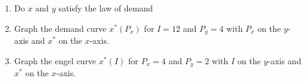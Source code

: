 \documentclass[11pt]{article}
\newcommand{\answer}[1]{\iftoggle{INCLUDEANSWERS}{{\color{violet!70!white}\textbf{Solution:} #1}}{}}
\begin{document}
\begin{enumerate}
\begin{enumerate}
    \item Do $x$ and $y$ satisfy the law of demand
    
    \item Graph the demand curve $x^*(P_x)$ for $I = 12$ and $P_y = 4$ with $P_x$ on the $y$-axis and $x^*$ on the $x$-axis.
    
    \item Graph the engel curve $x^*(I)$ for $P_x = 4$ and $P_y = 2$ with $I$ on the $y$-axis and $x^*$ on the $x$-axis.
  \end{enumerate}

  \answer{
    From above, $x^* = \frac{I}{2P_x}$ and $y^* = \frac{I}{2P_y}$
    \begin{enumerate}
      \item $\partial x^* / \partial I = \frac{1}{2P_x} > 0$. This is a normal good. $\partial y^* / \partial I = \frac{1}{2P_y} > 0$. This is a normal  good as well.
      
      \item Yes. $\partial x^* / \partial P_x < 0$ and $\partial y^* / \partial P_y < 0$.
      
      \item The demand curve is given by $x^*(P_x) = 12/P_x$. Solving for $P_x = 12/x^*$. Plot this.
      
      \item The engel curve is given by $x^*(P_x) = I/4$. Solving for $I = 4/x^*$. Plot this.
    \end{enumerate}
  }
\end{enumerate}
\end{document}

